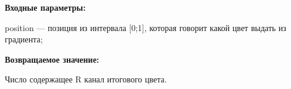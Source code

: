 \textbf{Входные параметры:}  

position --- позиция из интервала [0;1], которая говорит какой цвет выдать из градиента;

\textbf{Возвращаемое значение:}

Число содержащее R канал итогового цвета.